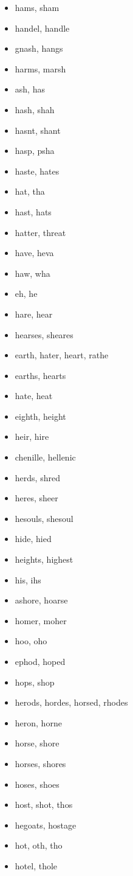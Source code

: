 \documentclass[a4wide,11pt]{report}
\begin{document}
\begin{itemize}
  \item hams, sham
  \item handel, handle
  \item gnash, hangs
  \item harms, marsh
  \item ash, has
  \item hash, shah
  \item hasnt, shant
  \item hasp, psha
  \item haste, hates
  \item hat, tha
  \item hast, hats
  \item hatter, threat
  \item have, heva
  \item haw, wha
  \item eh, he
  \item hare, hear
  \item hearses, sheares
  \item earth, hater, heart, rathe
  \item earths, hearts
  \item hate, heat
  \item eighth, height
  \item heir, hire
  \item chenille, hellenic
  \item herds, shred
  \item heres, sheer
  \item hesouls, shesoul
  \item hide, hied
  \item heights, highest
  \item his, ihs
  \item ashore, hoarse
  \item homer, moher
  \item hoo, oho
  \item ephod, hoped
  \item hops, shop
  \item herods, hordes, horsed, rhodes
  \item heron, horne
  \item horse, shore
  \item horses, shores
  \item hoses, shoes
  \item host, shot, thos
  \item hegoats, hostage
  \item hot, oth, tho
  \item hotel, thole

\end{itemize}
\end{document}
